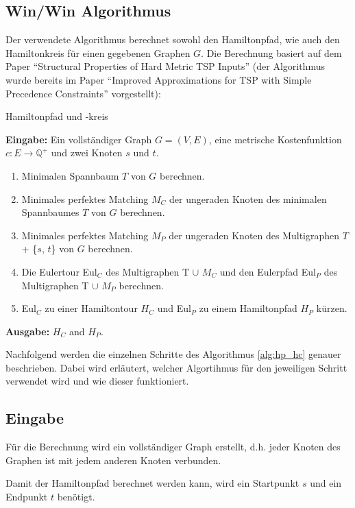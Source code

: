 \documentclass[11pt,a4paper]{article}
\begin{document}
\subsection{Win/Win Algorithmus}
Der verwendete Algorithmus berechnet sowohl den Hamiltonpfad, wie auch den Hamiltonkreis für einen gegebenen Graphen $G$. 
Die Berechnung basiert auf dem Paper "`Structural Properties of Hard Metric TSP Inputs"'\cite{moemke11} (der Algorithmus wurde bereits im Paper "`Improved Approximations for TSP with Simple Precedence Constraints"'\cite{boeckenhauer10} vorgestellt):

\begin{algorithm}
    \caption{Hamiltonpfad und -kreis \cite{moemke11}}
    \label{alg:hp_hc}
\textbf{Eingabe:} Ein vollständiger Graph $G = (V,E)$, eine metrische Kostenfunktion $c: E \rightarrow \mathbb{Q}^+$ und zwei Knoten $s$ und $t$.
    \begin{enumerate} \item Minimalen Spannbaum $T$ von $G$ berechnen.
        \item Minimales perfektes Matching $M_C$ der ungeraden Knoten des minimalen Spannbaumes $T$ von $G$ berechnen.
        \item Minimales perfektes Matching $M_P$ der ungeraden Knoten des Multigraphen $T$ + \{$s$, $t$\} von $G$ berechnen.
        \item Die Eulertour Eul$_C$ des Multigraphen T $\cup$ $M_C$ und den Eulerpfad Eul$_P$ des Multigraphen T $\cup$ $M_P$ berechnen.
        \item Eul$_C$ zu einer Hamiltontour $H_C$ und Eul$_P$ zu einem Hamiltonpfad $H_P$ kürzen.
    \end{enumerate}
\textbf{Ausgabe:} $H_C$ and $H_P$.

\end{algorithm}

Nachfolgend werden die einzelnen Schritte des Algorithmus \ref{alg:hp_hc} genauer beschrieben. Dabei wird erläutert, welcher Algortihmus für den jeweiligen Schritt verwendet wird und wie dieser funktioniert.

\subsection{Eingabe}
Für die Berechnung wird ein vollständiger Graph erstellt, d.h. jeder Knoten des Graphen ist mit jedem anderen Knoten verbunden.

Damit der Hamiltonpfad berechnet werden kann, wird ein Startpunkt $s$ und ein Endpunkt $t$ benötigt.
\end{document}
